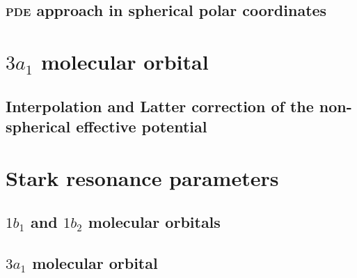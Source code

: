 \subsection{\textsc{pde} approach in spherical polar coordinates}

\section{$3a_{1}$ molecular orbital}
\label{ch:3a1}
\subsection{Interpolation and Latter correction of the
  non-spherical effective potential}




\section{Stark resonance parameters}
\label{ch:stark_params}
\subsection{$1b_{1}$ and $1b_{2}$ molecular orbitals}
\subsection{$3a_{1}$ molecular orbital}


